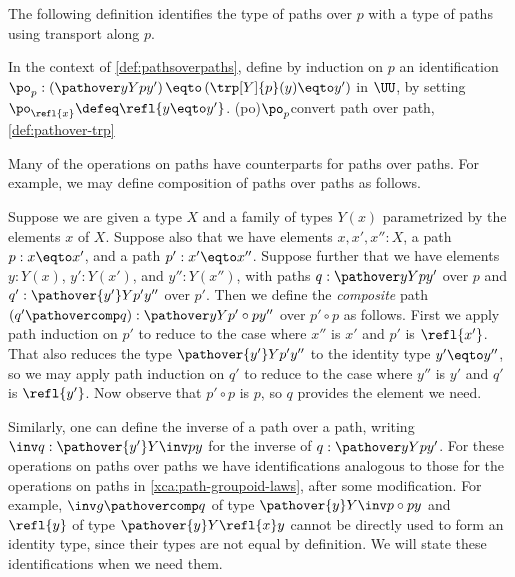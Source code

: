 The following definition identifies the type of paths over $p$ with a type
of paths using transport along $p$.

\begin{definition}\label{def:pathover-trp}
In the context of \cref{def:pathsoverpaths}, define by induction on $p$ an
identification
$\po_p: \left(\pathover y Y p {y'}\right) \eqto \left( \trp[Y]{p}(y) \eqto y'\right)$ in $\UU$,
by setting $\po_{\refl{x}} \defeq \refl{y \eqto y'}$.%
\glossary(po){$\protect\po_p$}{convert path over path, \cref{def:pathover-trp}}
\end{definition}

Many of the operations on paths have counterparts for paths over paths.
For example, we may define composition of paths over paths as follows.

\begin{definition}\label{def:pathovercomposition}
  Suppose we are given a type $X$ and a family of types $Y(x)$ parametrized by the elements $x$ of $X$.
  Suppose also that we have elements $x, x', x'' : X$, a path $p : x \eqto x'$, and a path $p' : x' \eqto x''$.
  Suppose further that we have elements $y : Y(x)$, $y' : Y(x')$, and $y'' : Y(x'')$, with paths $q : \pathover y Y p {y'}$ over $p$
  and $q' : \pathover {y'} Y {p'} {y''}$ over $p'$.
  Then we define the \emph{composite} path $(q' \pathovercomp q) : \pathover y Y {p' \circ p} {y''}$ over $p' \circ p$ as follows.
  First we apply path induction on $p'$ to reduce to the case where $x''$ is $x'$ and $p'$ is $\refl{x'}$.
  That also reduces the type $\pathover {y'} Y {p'} {y''}$ to the identity type $y' \eqto y''$, so we may apply path induction on $q'$ to reduce
  to the case where $y''$ is $y'$ and $q'$ is $\refl{y'}$.
  Now observe that $p' \circ p$ is $p$, so $q$ provides the element we need.
\end{definition}

Similarly, one can define the inverse of a path over a path,
writing $\inv q : \pathover {y'} Y {\inv p} y$ for the inverse
of $q : \pathover y Y p {y'}$.
For these operations on paths over paths we have identifications
analogous to those for the operations on paths in
\cref{xca:path-groupoid-laws}, after some modification.
For example,
${\inv g} \pathovercomp q$ of type $\pathover {y} Y {{\inv p}\circ p} y$ and
$\refl{y}$ of type $\pathover {y} Y {\refl{x}} y$ cannot be directly used
to form an identity type, since their types are not equal by definition.
We will state these identifications when we need them.

